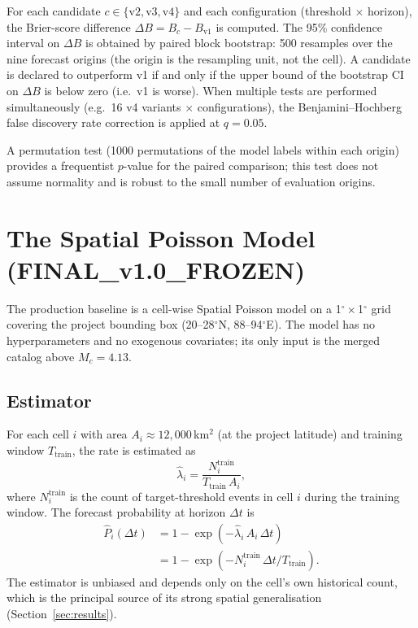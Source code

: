\documentclass[10pt,a4paper,twocolumn]{article}
\begin{document}
For each candidate $c\in\{\text{v2},\text{v3},\text{v4}\}$ and each configuration (threshold $\times$ horizon), the Brier-score difference $\Delta B = B_c - B_{\text{v1}}$ is computed. The 95\% confidence interval on $\Delta B$ is obtained by paired block bootstrap: 500 resamples over the nine forecast origins (the origin is the resampling unit, not the cell). A candidate is declared to outperform v1 if and only if the upper bound of the bootstrap CI on $\Delta B$ is below zero (i.e.\ v1 is worse). When multiple tests are performed simultaneously (e.g.\ 16 v4 variants $\times$ configurations), the Benjamini--Hochberg false discovery rate correction \cite{benjamini1995} is applied at $q=0.05$.

A permutation test (1000 permutations of the model labels within each origin) provides a frequentist $p$-value for the paired comparison; this test does not assume normality and is robust to the small number of evaluation origins.

\section{The Spatial Poisson Model (FINAL\_v1.0\_FROZEN)}\label{sec:spatial-poisson}

The production baseline is a cell-wise Spatial Poisson model on a 1$^\circ\times$1$^\circ$ grid covering the project bounding box (20--28$^\circ$N, 88--94$^\circ$E). The model has no hyperparameters and no exogenous covariates; its only input is the merged catalog above $M_c=4.13$.

\subsection{Estimator}

For each cell $i$ with area $A_i\approx 12{,}000$\,km$^2$ (at the project latitude) and training window $T_{\text{train}}$, the rate is estimated as
\begin{equation}\label{eq:cell-rate}
\hat\lambda_i = \frac{N_i^{\text{train}}}{T_{\text{train}}\,A_i},
\end{equation}
where $N_i^{\text{train}}$ is the count of target-threshold events in cell $i$ during the training window. The forecast probability at horizon $\Delta t$ is
\begin{equation}\label{eq:poisson-prob}
\begin{aligned}
\hat P_i(\Delta t) &= 1 - \exp\!\left(-\hat\lambda_i \, A_i \, \Delta t\right) \\
                  &= 1 - \exp\!\left(-N_i^{\text{train}} \, \Delta t / T_{\text{train}}\right).
\end{aligned}
\end{equation}
The estimator is unbiased and depends only on the cell's own historical count, which is the principal source of its strong spatial generalisation (Section~\ref{sec:results}).
\end{document}
